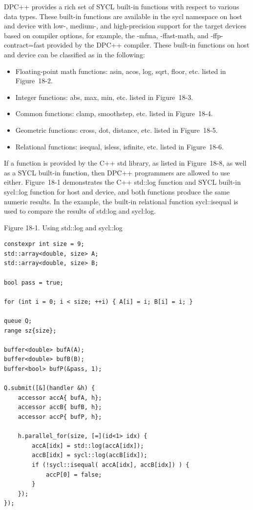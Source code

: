 DPC++ provides a rich set of SYCL built-in functions with respect to various data types. These built-in functions are available in the sycl namespace on host and device with low-, medium-, and high-precision support for the target devices based on compiler options, for example, the -mfma, -ffast-math, and -ffp-contract=fast provided by the DPC++ compiler. These built-in functions on host and device can be classified as in the following:\par

\begin{itemize}
	\item Floating-point math functions: asin, acos, log, sqrt, floor, etc. listed in Figure 18-2.
	\item Integer functions: abs, max, min, etc. listed in Figure 18-3.
	\item Common functions: clamp, smoothstep, etc. listed in Figure 18-4.
	\item Geometric functions: cross, dot, distance, etc. listed in Figure 18-5.
	\item Relational functions: isequal, isless, isfinite, etc. listed in Figure 18-6.
\end{itemize}

If a function is provided by the C++ std library, as listed in Figure 18-8, as well as a SYCL built-in function, then DPC++ programmers are allowed to use either. Figure 18-1 demonstrates the C++ std::log function and SYCL built-in sycl::log function for host and device, and both functions produce the same numeric results. In the example, the built-in relational function sycl::isequal is used to compare the results of std:log and sycl:log.\par

\hspace*{\fill} \par %
Figure 18-1. Using std::log and sycl::log
\begin{lstlisting}[caption={}]
constexpr int size = 9;
std::array<double, size> A;
std::array<double, size> B;

bool pass = true;

for (int i = 0; i < size; ++i) { A[i] = i; B[i] = i; }

queue Q;
range sz{size};

buffer<double> bufA(A);
buffer<double> bufB(B);
buffer<bool> bufP(&pass, 1);

Q.submit([&](handler &h) {
	accessor accA{ bufA, h};
	accessor accB{ bufB, h};
	accessor accP{ bufP, h};
	
	h.parallel_for(size, [=](id<1> idx) {
		accA[idx] = std::log(accA[idx]);
		accB[idx] = sycl::log(accB[idx]);
		if (!sycl::isequal( accA[idx], accB[idx]) ) {
			accP[0] = false;
		}
	});
});
\end{lstlisting}

